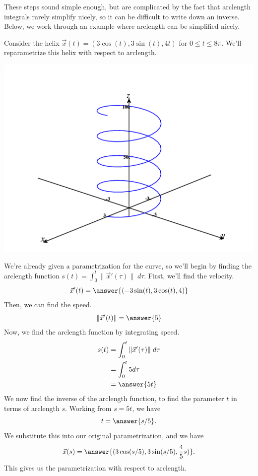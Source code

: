 \documentclass{ximera}
\begin{document}
These steps sound simple enough, but are complicated by the fact that arclength integrals rarely simplify nicely, so it can be difficult to write down an inverse. Below, we work through an example where arclength can be simplified nicely.

\begin{example}
Consider the helix $\vec{x}(t) = (3\cos(t), 3\sin(t), 4t)$ for $0\leq t \leq 8\pi$. We'll reparametrize this helix with respect to arclength.

\begin{image}
\includegraphics[width = \textwidth]{CalcPlot3D-arclength_ex}
\end{image}

We're already given a parametrization for the curve, so we'll begin by finding the arclength function $s(t) = \int_0^t \|\vec{x}'(\tau)\|\;d\tau$. First, we'll find the velocity.
\[
\vec{x}'(t) = \answer{(-3\sin(t),3\cos(t), 4)} 
\]
Then, we can find the speed.
\[
\|\vec{x}'(t)\| = \answer{5}
\]
Now, we find the arclength function by integrating speed.
\begin{align*}
s(t) &= \int_0^t \|\vec{x}'(\tau)\|\;d\tau\\
&= \int_0^t 5d\tau\\
&= \answer{5t}
\end{align*}
We now find the inverse of the arclength function, to find the parameter $t$ in terms of arclength $s$. Working from $s=5t$, we have
\[
t = \answer{s/5}.
\]
We substitute this into our original parametrization, and we have
\[
\vec{x}(s) = \answer{(3\cos(s/5), 3\sin(s/5), \frac{4}{5}s)}.
\]
This gives us the parametrization with respect to arclength.
\end{example}
\end{document}
